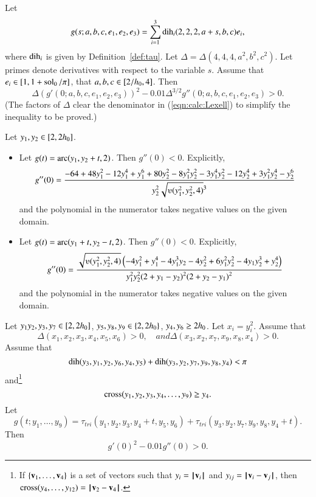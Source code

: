 \begin{calculation}\cutrate{}\label{calc:Lexell}
Let
\[ 
g(s;a,b,c,e_1,e_2,e_3) = \sum_{i=1}^3 \operatorname{dih}_i(2,2,2,a+s,b,c) e_i,
\] 
where $\operatorname{dih}_i$ is given by Definition~\ref{def:tau}.
Let $\Delta = \Delta(4,4,4,a^2,b^2,c^2)$.
Let primes denote derivatives with respect to the variable $s$.
Assume that
$e_i\in[1,1+\operatorname{sol}_0/\pi]$,  that
$a,b,c\in[2/{h_0},4]$.
Then
\begin{equation}\label{eqn:calc:Lexell}
  \Delta (g'(0;a,b,c,e_1,e_2,e_3))^2 
- 0.01\Delta^{3/2}g''(0;a,b,c,e_1,e_2,e_3) > 0.
\end{equation}
(The factors of $\Delta$ clear the denominator in
(\ref{eqn:calc:Lexell}) to simplify the inequality to be proved.)
\end{calculation}

\begin{calculation}\cutrate{}\label{calc:2der}
Let $y_1,y_2\in [ 2,2{h_0}]$.  
\begin{itemize}\wasitemize 
\item 
Let $g(t) = \operatorname{arc}(y_1,y_2+t,2)$.  Then $g''(0) < 0$.
Explicitly,
\[ 
  g''(0) = \dfrac{
    -64 + 48y_1^2 - 12 y_1^4 + y_1^6 
  + 80 y_2^2 - 8 y_1^2 y_2^2 - 3 y_1^4 y_2^2
    - 12 y_2 ^4 + 3 y_1^2 y_2^4 - y_2^6
  }{y_2^2 \sqrt{\ups(y_1^2,y_2^2,4)}^3}
\] 
and the polynomial in the numerator takes negative values on the given
domain.
\item
Let $g(t) = \operatorname{arc}(y_1+t,y_2-t,2)$.  Then $g''(0) < 0$.
Explicitly,
\[ 
  g''(0) = \dfrac{\sqrt{\ups(y_1^2,y_2^2,4)} \left(
      -4 y_1^2 + y_1^4 - 4y_1^3 y_2 - 4y_2^2 
   + 6 y_1^2 y_2^2 - 4 y_1 y_2^3 +y_2^4
    \right)}{y_1^2 y_2^2 (2+y_1-y_2)^2 (2+y_2-y_1)^2}
\] 
and the polynomial in the numerator takes negative values on the given
domain.
\end{itemize}\wasitemize 
\end{calculation}

\begin{calculation}\cutrate{}\label{calc:cc:qua}  %
Let $y_1y_2,y_3,y_7\in [ 2,2{h_0}]$,
$y_5,y_8,y_9\in \{2,2{h_0}\}$, $y_4,y_6\ge 2{h_0}$.
Let $x_i = y_i^2$.
Assume that
\[ 
\Delta(x_1,x_2,x_3,x_4,x_5,x_6)>0,\quad{ and }
\Delta(x_3,x_2,x_7,x_9,x_8,x_4)>0.
\] 
Assume that
\[ 
\operatorname{dih}(y_3,y_1,y_2,y_6,y_4,y_5)+\operatorname{dih}(y_3,y_2,y_7,y_9,y_8,y_4) < \pi
\] 
and\footnote{If $\{{\mathbf v}_1,\ldots,{\mathbf v}_4\}$ is a set of vectors such that
$y_i = {{\hskip0.1em|\hskip-0.15em|\hskip0.1em}{\mathbf v}_i{\hskip0.1em|\hskip-0.15em|\hskip0.1em}}$ and $y_{ij} = \norm{\v_i}{\v_j}$, then
$\op{cross}(y_4,\ldots,y_{12}) = \norm{\v_2}{\v_4}$.}
\[ 
{\operatorname{cross}}(y_1,y_2,y_3,y_4,\ldots,y_9) \ge y_4.
\] 
Let 
\[ g(t;y_1,\ldots,y_9) =
  \tau_{tri}(y_1,y_2,y_3,y_4+t,y_5,y_6)+\tau_{tri}(y_3,y_2,y_7,y_9,y_8,y_4+t).
\] 
Then \[ g'(0)^2 - 0.01 g''(0) > 0.\] 
\end{calculation}


